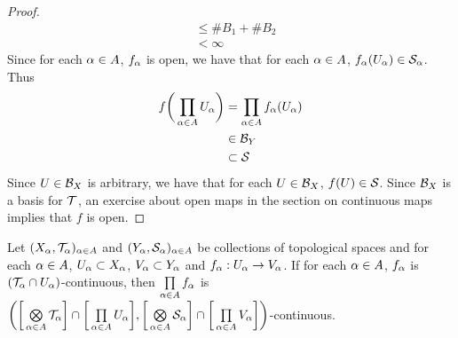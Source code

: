 \documentclass{book}
\begin{document}
\begin{proof}
\begin{align*}
			& \leq \# B_1 + \# B_2 \\
			& < \infty
		\end{align*}
		Since for each $\alpha \in A$, $f_{\alpha}$ is open, we have that for each $\alpha \in A$, $f_{\alpha}(U_{\alpha}) \in \mathcal{S}_{\alpha}$. Thus
		\begin{align*}
			f\bigg( \prod\limits_{\alpha \in A} U_{\alpha}\bigg) 
			& = \prod_{\alpha \in A} f_{\alpha}(U_{\alpha}) \\
			& \in \mathcal{B}_{Y} \\
			& \subset \mathcal{S}
		\end{align*}
		Since $U \in \mathcal{B}_X$ is arbitrary, we have that for each $U \in \mathcal{B}_X$, $f(U) \in \mathcal{S}$. Since $\mathcal{B}_X$ is a basis for $\mathcal{T}$, an exercise about open maps in the section on continuous maps implies that $f$ is open.
	\end{proof}

	\begin{ex} 
		Let $(X_{\alpha}, \mathcal{T}_{\alpha})_{\alpha \in A}$ and $(Y_{\alpha}, \mathcal{S}_{\alpha})_{\alpha \in A}$ be collections of topological spaces and for each $\alpha \in A$, $U_{\alpha} \subset X_{\alpha}$, $V_{\alpha} \subset Y_{\alpha}$ and $f_{\alpha}:U_{\alpha} \rightarrow V_{\alpha}$. If for each $\alpha \in A$, $f_{\alpha}$ is $(\mathcal{T}_{\alpha} \cap U_{\alpha})$-continuous, then $\prod\limits_{\alpha \in A} f_{\alpha}$ is $\bigg( \bigg[ \bigotimes\limits_{\alpha \in A} \mathcal{T}_{\alpha} \bigg] \cap \bigg[ \prod\limits_{\alpha \in A} U_{\alpha} \bigg], \bigg[ \bigotimes\limits_{\alpha \in A} \mathcal{S}_{\alpha} \bigg] \cap \bigg[ \prod\limits_{\alpha \in A} V_{\alpha} \bigg] \bigg)$-continuous.
	\end{ex}
	
\end{document}
